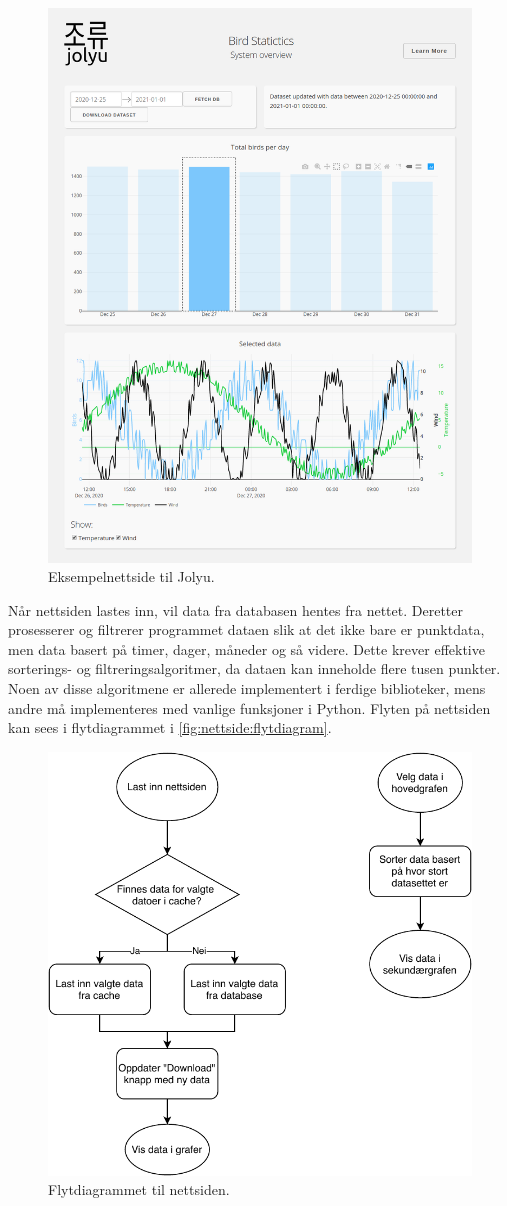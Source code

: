 \begin{figure}[!htbp]
    \centering
    \includegraphics[width=.9\textwidth]{implementering/nettside/nettside.png}
    \caption{Eksempelnettside til Jolyu.}
    \label{fig:nettside:nettside}
\end{figure}

Når nettsiden lastes inn, vil data fra databasen hentes fra nettet. 
Deretter prosesserer og filtrerer programmet dataen slik at det ikke bare er punktdata, men data basert på timer, dager, måneder og så videre. 
Dette krever effektive sorterings- og filtreringsalgoritmer, da dataen kan inneholde flere tusen punkter.
Noen av disse algoritmene er allerede implementert i ferdige biblioteker, mens andre må implementeres med vanlige funksjoner i Python. 
Flyten på nettsiden kan sees i flytdiagrammet i \autoref{fig:nettside:flytdiagram}.

\begin{figure}[!htbp]
    \centering
    \includegraphics[width=.5\textwidth]{implementering/nettside/JolyuNettsideOverordnetFlyt.pdf}
    \caption{Flytdiagrammet til nettsiden.}
    \label{fig:nettside:flytdiagram}
\end{figure}

